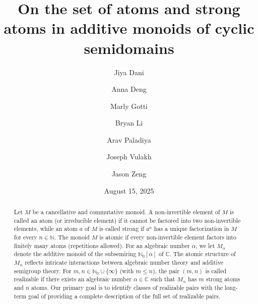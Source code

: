 \documentclass[11pt]{amsart}
\theoremstyle{definition}
\theoremstyle{remark}
\numberwithin{equation}{section}
\newcommand{\cc}{\mathbb{C}}
\newcommand{\nn}{\mathbb{N}}
\begin{document}
	
\mbox{}
\title{On the set of atoms and strong atoms in additive monoids of cyclic semidomains}

\author{Jiya Dani}
\address{CMI\\MIT\\Cambridge, MA 02139}

\author{Anna Deng}
\address{CMI\\MIT\\Cambridge, MA 02139}

 \author{Marly Gotti}
 \address{Apple Inc.\\One Apple Park Way\\Cupertino, CA 95014}

\author{Bryan Li}
\address{CMI\\MIT\\Cambridge, MA 02139}

\author{Arav Paladiya}
\address{CMI\\MIT\\Cambridge, MA 02139}

\author{Joseph Vulakh}
\address{Department of Mathematics\\MIT\\Cambridge, MA 02139}

\author{Jason Zeng}
\address{CMI\\MIT\\Cambridge, MA 02139}


\date{August 15, 2025}

\begin{abstract}
	Let $M$ be a cancellative and commutative monoid. A non-invertible element of $M$ is called an atom (or irreducible element) if it cannot be factored into two non-invertible elements, while an atom $a$ of $M$ is called strong if $a^n$ has a unique factorization in $M$ for every $n \in \nn$. The monoid $M$ is atomic if every non-invertible element factors into finitely many atoms (repetitions allowed). For an algebraic number $\alpha$, we let $M_\alpha$ denote the additive monoid of the subsemiring $\nn_0[\alpha]$ of $\cc$. The atomic structure of $M_\alpha$ reflects intricate interactions between algebraic number theory and additive semigroup theory. For $m, n \in \nn_0 \cup \{ \infty \}$ (with $m \le n$), the pair $(m,n)$ is called realizable if there exists an algebraic number $\alpha \in \cc$ such that $M_\alpha$ has $m$ strong atoms and $n$ atoms. Our primary goal is to identify classes of realizable pairs with the long-term goal of providing a complete description of the full set of realizable pairs.
\end{abstract}
\end{document}
